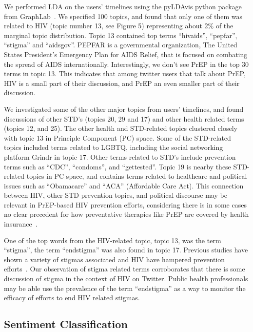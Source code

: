 \documentclass[conference]{IEEEtran}
\begin{document}
We performed LDA on the users' timelines using the pyLDAvis python package from GraphLab~\cite{low2014graphlab}. We specified 100 topics, and found that only one of them was related to HIV (topic number 13, see Figure 5) representing about 2\% of the marginal topic distribution. Topic 13 contained top terms ``hivaids'', ``pepfar'', ``stigma'' and ``aidsgov''. PEPFAR is a governmental organization, The United States President's Emergency Plan for AIDS Relief, that is focused on combating the spread of AIDS internationally. Interestingly, we don't see PrEP in the top 30 terms in topic 13. This indicates that among twitter users that talk about PrEP, HIV is a small part of their discussion, and PrEP an even smaller part of their discussion.

We investigated some of the other major topics from users' timelines, and found discussions of other STD's (topics 20, 29 and 17) and other health related terms (topics 12, and 25). The other health and STD-related topics clustered closely with topic 13 in Principle Component (PC) space. Some of the STD-related topics included terms related to LGBTQ, including the social networking platform Grindr in topic 17. Other terms related to STD's include prevention terms such as ``CDC'', ``condoms'', and ``gettested''. Topic 19 is nearby these STD-related topics in PC space, and contains terms related to healthcare and political issues such as ``Obamacare'' and ``ACA'' (Affordable Care Act). This connection between HIV, other STD prevention topics, and political discourse may be relevant in PrEP-based HIV prevention efforts, considering there is in some cases no clear precedent for how preventative therapies like PrEP are covered by health insurance~\cite{liu2014early}.

One of the top words from the HIV-related topic, topic 13, was the term ``stigma'', the term ``endstigma'' was also found in topic 17. Previous studies have shown a variety of stigmas associated and HIV have hampered prevention efforts~\cite{liu2014early}. Our observation of stigma related terms corroborates that there is some discussion of stigma in the context of HIV on Twitter. Public health professionals may be able use the prevalence of the term ``endstigma'' as a way to monitor the efficacy of efforts to end HIV related stigmas.

\subsection{Sentiment Classification}
\end{document}
